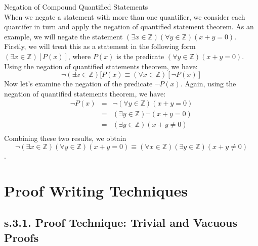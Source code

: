 \begin{definition}
Negation of Compound Quantified Statements \\

When we negate a statement with more than one quantifier, we consider each quantifer in turn and apply the negation of quantified statement theorem. As an example, we will negate the statement $(\exists x \in \mathbb{Z})(\forall y \in \mathbb{Z})(x + y = 0)$. 
Firstly, we will treat this as a statement in the following form $(\exists x \in \mathbb{Z})[P(x)]$, where $P(x)$ is the predicate $(\forall y \in \mathbb{Z})(x + y = 0)$. Using the negation of quantified statements theorem, we have: \[ \neg (\exists x \in \mathbb{Z})[P(x) \equiv (\forall x \in \mathbb{Z})[\neg P(x)] \] Now let's  examine the negation of the predicate $\neg P(x)$. Again, using the negation of quantified statements theorem, we have: 
	\begin{eqnarray}
		\neg P(x) & = & \neg (\forall y \in \mathbb{Z})(x + y = 0) \nonumber \\
		& = & (\exists y \in \mathbb{Z})\neg (x + y = 0) \nonumber \\
		& = & (\exists y \in \mathbb{Z})(x + y \neq 0) \nonumber \\
	\end{eqnarray}
Combining these two results, we obtain \[ \neg (\exists x \in \mathbb{Z})(\forall y \in \mathbb{Z})(x + y = 0) \equiv (\forall x \in \mathbb{Z})(\exists y \in \mathbb{Z})(x + y \neq 0) \].

\end{definition}





\newpage
\section{Proof Writing Techniques}
\subsection{s.3.1. Proof Technique: Trivial and Vacuous Proofs}
